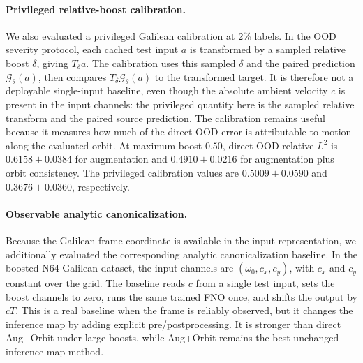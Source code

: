 \paragraph{Privileged relative-boost calibration.} We also evaluated a privileged Galilean calibration at 2\% labels. In the OOD severity protocol, each cached test input \(a\) is transformed by a sampled relative boost \(\delta\), giving \(T_\delta a\). The calibration uses this sampled \(\delta\) and the paired prediction \(\mathcal G_\theta(a)\), then compares \(T_\delta\mathcal G_\theta(a)\) to the transformed target. It is therefore not a deployable single-input baseline, even though the absolute ambient velocity \(c\) is present in the input channels: the privileged quantity here is the sampled relative transform and the paired source prediction. The calibration remains useful because it measures how much of the direct OOD error is attributable to motion along the evaluated orbit. At maximum boost \(0.50\), direct OOD relative \(L^2\) is \(0.6158\pm0.0384\) for augmentation and \(0.4910\pm0.0216\) for augmentation plus orbit consistency. The privileged calibration values are \(0.5009\pm0.0590\) and \(0.3676\pm0.0360\), respectively.

\paragraph{Observable analytic canonicalization.} Because the Galilean frame coordinate is available in the input representation, we additionally evaluated the corresponding analytic canonicalization baseline. In the boosted N64 Galilean dataset, the input channels are \((\omega_0,c_x,c_y)\), with \(c_x\) and \(c_y\) constant over the grid. The baseline reads \(c\) from a single test input, sets the boost channels to zero, runs the same trained FNO once, and shifts the output by \(cT\). This is a real baseline when the frame is reliably observed, but it changes the inference map by adding explicit pre/postprocessing. It is stronger than direct Aug+Orbit under large boosts, while Aug+Orbit remains the best unchanged-inference-map method.

